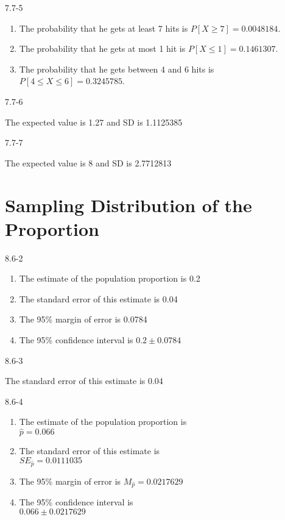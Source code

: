 \begin{exsol@solution}{7.7-5}

\begin{enumerate}
\item The probability that he gets at least 7 hits is $P[X \ge 7] = 0.0048184$.
\item The probability that he gets at most 1 hit is $P[X \le 1] = 0.1461307$.
\item The probability that he gets between 4 and 6 hits is $P[4 \le X \le 6] = 0.3245785$.
\end{enumerate}

\end{exsol@solution}
\begin{exsol@solution}{7.7-6}

The expected value is 1.27 and SD is 1.1125385

\end{exsol@solution}
\begin{exsol@solution}{7.7-7}

The expected value is 8 and SD is 2.7712813
\end{exsol@solution}
\setcounter{chapter}{8}\chapter{Sampling Distribution of the Proportion}
\begin{exsol@solution}{8.6-2}

\begin{enumerate}
\item The estimate of the population proportion is 0.2
\item The standard error of this estimate is 0.04
\item The 95\% margin of error is 0.0784
\item The 95\% confidence interval is $0.2 $
\end{enumerate}
\end{exsol@solution}
\begin{exsol@solution}{8.6-3}

The standard error of this estimate is 0.04

\end{exsol@solution}
\begin{exsol@solution}{8.6-4}

\begin{enumerate}
\item	The estimate of the population proportion is \\ $ = 0.066$
\item	The standard error of this estimate is \\ $SE_{} = 0.0111035$
\item	The 95\% margin of error is $M_{} = 0.0217629$
\item	The 95\% confidence interval is \\ $0.066 $
\end{enumerate}
\end{exsol@solution}
